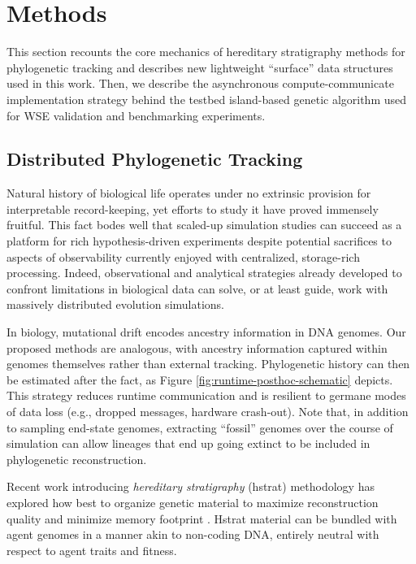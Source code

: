 \section{Methods} \label{sec:methods}



This section recounts the core mechanics of hereditary stratigraphy methods for phylogenetic tracking and describes new lightweight ``surface'' data structures used in this work.
Then, we describe the asynchronous compute-communicate implementation strategy behind the testbed island-based genetic algorithm used for WSE validation and benchmarking experiments.

\subsection{Distributed Phylogenetic Tracking}

Natural history of biological life operates under no extrinsic provision for interpretable record-keeping, yet efforts to study it have proved immensely fruitful.
This fact bodes well that scaled-up simulation studies can succeed as a platform for rich hypothesis-driven experiments despite potential sacrifices to aspects of observability currently enjoyed with centralized, storage-rich processing.
Indeed, observational and analytical strategies already developed to confront limitations in biological data can solve, or at least guide, work with massively distributed evolution simulations.

In biology, mutational drift encodes ancestry information in DNA genomes.
Our proposed methods are analogous, with ancestry information captured within genomes themselves rather than external tracking.
Phylogenetic history can then be estimated after the fact, as Figure \ref{fig:runtime-posthoc-schematic} depicts.
This strategy reduces runtime communication and is resilient to germane modes of data loss (e.g., dropped messages, hardware crash-out).
Note that, in addition to sampling end-state genomes, extracting ``fossil'' genomes over the course of simulation can allow lineages that end up going extinct to be included in phylogenetic reconstruction.

Recent work introducing \textit{hereditary stratigraphy} (hstrat) methodology has explored how best to organize genetic material to maximize reconstruction quality and minimize memory footprint \citep{moreno2022hstrat, moreno2022hereditary}.
Hstrat material can be bundled with agent genomes in a manner akin to non-coding DNA, entirely neutral with respect to agent traits and fitness.

